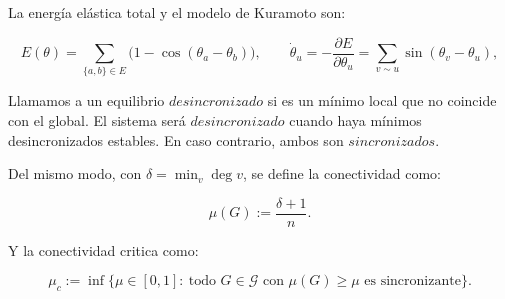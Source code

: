 La energía elástica total y el modelo de Kuramoto \citep{10.1007/BFb0013365} son:
\begin{eqbox}\[
E(\theta)=\sum_{\{a,b\}\in E}\bigl(1-\cos(\theta_a-\theta_b)\bigr),\qquad
\dot\theta_u=-\frac{\partial E}{\partial\theta_u}=\sum_{v\sim u}\sin(\theta_v-\theta_u),
\]\end{eqbox}
Llamamos a un equilibrio  $desincronizado$ si es un mínimo local que no coincide con el global. El sistema será $desincronizado$ cuando haya mínimos desincronizados estables. En caso contrario, ambos son $sincronizados$. 

Del mismo modo, con $\delta=\min_v\deg v$, se define la conectividad como: 
\begin{eqbox}\[
\mu(G):=\frac{\delta+1}{n}.
\]\end{eqbox}

Y la conectividad critica como:
\begin{eqbox}\[
\mu_c:=\inf\bigl\{\mu\in[0,1]:\ \text{todo }G\in\mathcal G\text{ con }\mu(G)\ge\mu\text{ es sincronizante}\bigr\}.
\]\end{eqbox}
